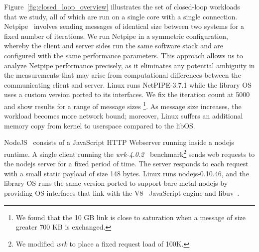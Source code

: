 
Figure~\ref{fig:closed_loop_overview} illustrates the set of closed-loop workloads that we study, all of which are run on a single core with a single connection.
Netpipe~\cite{snell1996netpipe} involves sending messages of identical size between two systems for a fixed number of iterations.
We run Netpipe in a symmetric configuration, whereby the client and server sides run the same software stack and are configured with the same performance parameters. This approach allows us to analyze Netpipe performance precisely, as it eliminates any potential ambiguity in the measurements that may arise from computational differences between the communicating client and server.
Linux runs NetPIPE-3.7.1 while the library OS uses a custom version ported to its interfaces.
We fix the iteration count at 5000 and show results for a range of message sizes \footnote{We found that the 10 GB link is close to saturation when a message of size greater 700 KB is exchanged.}.
As message size increases, the workload becomes more network bound; moreover, Linux suffers an additional memory copy from kernel to userspace compared to the libOS.

NodeJS~\cite{nodejs} consists of a JavaScript HTTP Webserver running inside a nodejs runtime. A single client running the \textit{wrk-4.0.2}~\cite{wrk} benchmark\footnote{We modified \textit{wrk} to place a fixed request load of 100K.} sends web requests to the nodejs server for a fixed period of time. The server responds to each request with a small static payload of size 148 bytes.
Linux runs nodejs-0.10.46, and the library OS runs the same version ported to support bare-metal nodejs by providing OS interfaces that link with the V8~\cite{v8} JavaScript engine and libuv~\cite{libuv}. 

